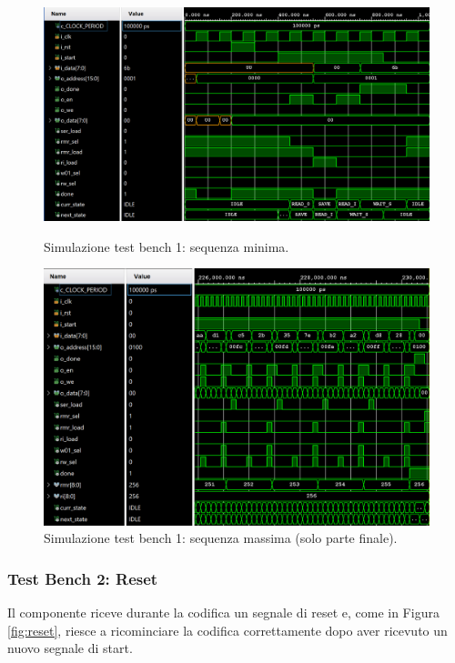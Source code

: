 \documentclass[fleqn,11pt]{article}
\begin{document}
\begin{figure}[ht]
    \centering
    \begin{minipage}{.45\textwidth}
        \centering
        \includegraphics[width=\textwidth]{seq_min}
        \caption{Simulazione test bench 1: sequenza minima.}
        \label{fig:seq_min}
    \end{minipage}
    \hfill
    \begin{minipage}{.45\textwidth}
        \centering
        \includegraphics[width=\textwidth]{seq_max}
        \caption{Simulazione test bench 1: sequenza massima (solo parte finale).}
        \label{fig:seq_max}
    \end{minipage}
\end{figure}
\pagebreak
\subsubsection{Test Bench 2: Reset}
Il componente riceve durante la codifica un segnale di reset e, come in Figura \ref{fig:reset}, riesce a ricominciare la codifica correttamente dopo aver ricevuto un nuovo segnale di start.
\end{document}
